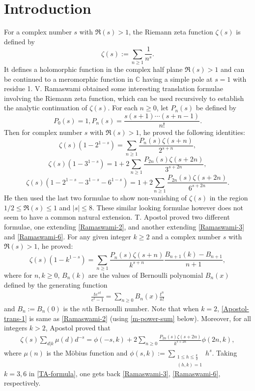 \documentclass[12pt]{amsart}
\newcommand{\C}{{\mathbb C}}
\begin{document}
\section{Introduction}
For a complex number $s$ with $\Re(s)>1$, the Riemann zeta function $\zeta(s)$ is defined by
$$
\zeta(s):=\sum_{n\ge 1}\frac{1}{n^s}.
$$
It defines a holomorphic function in the complex half plane $\Re(s)>1$ and can be
continued to a meromorphic function in $\C$ having a simple pole at $s=1$ with residue 1. 
V. Ramaswami \cite{VR} obtained some interesting translation formulae involving 
the Riemann zeta function, which can be used recursively to establish the analytic 
continuation of $\zeta(s)$.
For each $n\geq 0$, let $P_n(s)$ be defined by 
$$
P_0(s)=1, P_n(s)=\frac{s(s+1)\cdots(s+n-1)}{n!}.
$$
Then for complex number $s$ with $\Re(s)>1$, he \cite{VR} proved the following identities:
\begin{equation}\label{Ramaswami-2}
\zeta(s)\left(1-2^{1-s}\right)=\sum_{n\ge 1}\frac{P_n(s)\zeta(s+n)}{2^{s+n}},
\end{equation}
\begin{equation}\label{Ramaswami-3}
\zeta(s)\left(1-3^{1-s}\right)=1+2\sum_{n\ge 1}\frac{P_{2n}(s)\zeta(s+2n)}{3^{s+2n}},
\end{equation}
\begin{equation}\label{Ramaswami-6}
\zeta(s)\left(1-2^{1-s}-3^{1-s}-6^{1-s}\right)=1+2\sum_{n\ge 1}\frac{P_{2n}(s)\zeta(s+2n)}{6^{s+2n}}.
\end{equation}
He then used the last two formulae to show non-vanishing of $\zeta(s)$ in the region $1/2 \le \Re(s) \le 1$ and $|s| \le 8$.
These similar looking formulae however does not seem to have a common natural extension.
T. Apostol \cite{TA} proved two different formulae, one extending \eqref{Ramaswami-2}, and another
extending \eqref{Ramaswami-3} and \eqref{Ramaswami-6}.
For any given integer $k\geq 2$  and a complex number $s$ with $\Re(s)>1$, he proved:
\begin{equation}\label{Apostol-trans-1}
\zeta(s)\left(1-k^{1-s}\right)=\sum_{n\ge 1}\frac{P_{n}(s)\zeta(s+n)}{k^{s+n}}\frac{B_{n+1}(k)-B_{n+1}}{n+1},
\end{equation}
where for $n,k\geq 0$, $B_{n}(k)$ are the values of Bernoulli polynomial $B_n(x)$ defined by the generating function
\begin{align}\label{Bernoulli-poly}
\frac{te^{xt}}{e^t-1}=\sum_{n\geq 0}B_{n}(x)\frac{t^n}{n!}
\end{align}
and $B_n:=B_n(0)$ is the $n$th Bernoulli number.
Note that when $k=2$, \eqref{Apostol-trans-1} is same as \eqref{Ramaswami-2} (using \eqref{m-power-sum} below).
Moreover, for all integers $k>2$, Apostol \cite{TA} proved that
\begin{align}\label{TA-formula}
\zeta(s)\sum_{d|k}\mu(d)d^{-s}=\phi(-s,k)+2\sum_{n\ge 0}\frac{P_{2n}(s)\zeta(s+2n)}{k^{s+2n}}\phi(2n,k),
\end{align}
where $\mu(n)$ is the Möbius function and  $\phi(s,k):=\sum_{\substack{1\leq h\leq \frac{k}{2}\\ (h,k)=1}}h^{s}$. 
Taking $k=3, 6$ in \eqref{TA-formula}, one gets back \eqref{Ramaswami-3}, \eqref{Ramaswami-6}, respectively.
\end{document}
